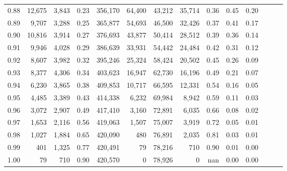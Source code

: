 \begin{tabular}{rrrrrrrrrrrrrr}
0.88 &  12,675 &  3,843 &  0.23 &  356,170 &   64,400 &  43,212 &  35,714 &  0.36 &  0.45 &      0.20 \\
0.89 &   9,707 &  3,288 &  0.25 &  365,877 &   54,693 &  46,500 &  32,426 &  0.37 &  0.41 &      0.17 \\
0.90 &  10,816 &  3,914 &  0.27 &  376,693 &   43,877 &  50,414 &  28,512 &  0.39 &  0.36 &      0.14 \\
0.91 &   9,946 &  4,028 &  0.29 &  386,639 &   33,931 &  54,442 &  24,484 &  0.42 &  0.31 &      0.12 \\
0.92 &   8,607 &  3,982 &  0.32 &  395,246 &   25,324 &  58,424 &  20,502 &  0.45 &  0.26 &      0.09 \\
0.93 &   8,377 &  4,306 &  0.34 &  403,623 &   16,947 &  62,730 &  16,196 &  0.49 &  0.21 &      0.07 \\
0.94 &   6,230 &  3,865 &  0.38 &  409,853 &   10,717 &  66,595 &  12,331 &  0.54 &  0.16 &      0.05 \\
0.95 &   4,485 &  3,389 &  0.43 &  414,338 &    6,232 &  69,984 &   8,942 &  0.59 &  0.11 &      0.03 \\
0.96 &   3,072 &  2,907 &  0.49 &  417,410 &    3,160 &  72,891 &   6,035 &  0.66 &  0.08 &      0.02 \\
0.97 &   1,653 &  2,116 &  0.56 &  419,063 &    1,507 &  75,007 &   3,919 &  0.72 &  0.05 &      0.01 \\
0.98 &   1,027 &  1,884 &  0.65 &  420,090 &      480 &  76,891 &   2,035 &  0.81 &  0.03 &      0.01 \\
0.99 &     401 &  1,325 &  0.77 &  420,491 &       79 &  78,216 &     710 &  0.90 &  0.01 &      0.00 \\
1.00 &      79 &    710 &  0.90 &  420,570 &        0 &  78,926 &       0 &   nan &  0.00 &      0.00 \\
\bottomrule
\end{tabular}
